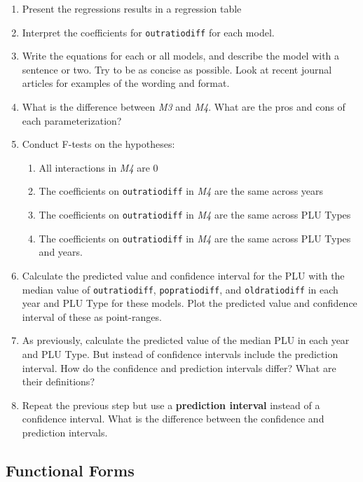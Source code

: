 \documentclass[]{article}
\providecommand{\tightlist}{%
  \setlength{\itemsep}{0pt}\setlength{\parskip}{0pt}}
\begin{document}
\begin{enumerate}
\def\labelenumi{\arabic{enumi}.}
\item
  Present the regressions results in a regression table
\item
  Interpret the coefficients for \texttt{outratiodiff} for each model.
\item
  Write the equations for each or all models, and describe the model
  with a sentence or two. Try to be as concise as possible. Look at
  recent journal articles for examples of the wording and format.
\item
  What is the difference between \emph{M3} and \emph{M4}. What are the
  pros and cons of each parameterization?
\item
  Conduct F-tests on the hypotheses:

  \begin{enumerate}
  \def\labelenumii{\arabic{enumii}.}
  \tightlist
  \item
    All interactions in \emph{M4} are 0
  \item
    The coefficients on \texttt{outratiodiff} in \emph{M4} are the same
    across years
  \item
    The coefficients on \texttt{outratiodiff} in \emph{M4} are the same
    across PLU Types
  \item
    The coefficients on \texttt{outratiodiff} in \emph{M4} are the same
    across PLU Types and years.
  \end{enumerate}
\item
  Calculate the predicted value and confidence interval for the PLU with
  the median value of \texttt{outratiodiff}, \texttt{popratiodiff}, and
  \texttt{oldratiodiff} in each year and PLU Type for these models. Plot
  the predicted value and confidence interval of these as point-ranges.
\item
  As previously, calculate the predicted value of the median PLU in each
  year and PLU Type. But instead of confidence intervals include the
  prediction interval. How do the confidence and prediction intervals
  differ? What are their definitions?
\item
  Repeat the previous step but use a \textbf{prediction interval}
  instead of a confidence interval. What is the difference between the
  confidence and prediction intervals.
\end{enumerate}

\subsection{Functional Forms}\label{functional-forms}
\end{document}
